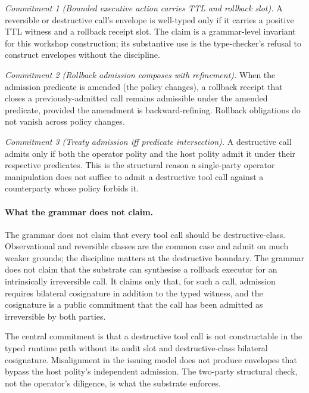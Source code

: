 \emph{Commitment 1 (Bounded executive action carries TTL and rollback slot).} A reversible or destructive call's envelope is well-typed only if it carries a positive TTL witness and a rollback receipt slot. The claim is a grammar-level invariant for this workshop construction; its substantive use is the type-checker's refusal to construct envelopes without the discipline.

\emph{Commitment 2 (Rollback admission composes with refinement).} When the admission predicate is amended (the policy changes), a rollback receipt that closes a previously-admitted call remains admissible under the amended predicate, provided the amendment is backward-refining. Rollback obligations do not vanish across policy changes.

\emph{Commitment 3 (Treaty admission iff predicate intersection).} A destructive call admits only if both the operator polity and the host polity admit it under their respective predicates. This is the structural reason a single-party operator manipulation does not suffice to admit a destructive tool call against a counterparty whose policy forbids it.

\paragraph{What the grammar does not claim.}
The grammar does not claim that every tool call should be destructive-class. Observational and reversible classes are the common case and admit on much weaker grounds; the discipline matters at the destructive boundary. The grammar does not claim that the substrate can synthesise a rollback executor for an intrinsically irreversible call. It claims only that, for such a call, admission requires bilateral cosignature in addition to the typed witness, and the cosignature is a public commitment that the call has been admitted as irreversible by both parties.

The central commitment is that a destructive tool call is not constructable in the typed runtime path without its audit slot and destructive-class bilateral cosignature. Misalignment in the issuing model does not produce envelopes that bypass the host polity's independent admission. The two-party structural check, not the operator's diligence, is what the substrate enforces.
